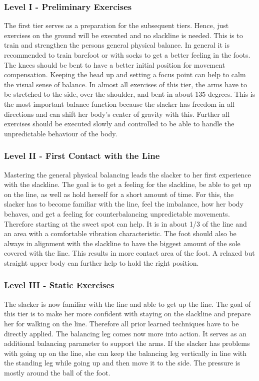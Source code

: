 \subsubsection{Level I - Preliminary Exercises}
The first tier serves as a preparation for the subsequent tiers. Hence, just exercises on the ground will be executed and no slackline is needed. This is to train and strengthen the persons general physical balance. In general it is recommended to train barefoot or with socks to get a better feeling in the foots. The knees should be bent to have a better initial position for movement compensation. Keeping the head up and setting a focus point can help to calm the visual sense of balance. In almost all exercises of this tier, the arms have to be stretched to the side, over the shoulder, and bent in about 135 degrees. This is the most important balance function because the slacker has freedom in all directions and can shift her body's center of gravity with this. Further all exercises should be executed slowly and controlled to be able to handle the unpredictable behaviour of the body.

\subsubsection{Level II - First Contact with the Line}
Mastering the general physical balancing leads the slacker to her first experience with the slackline. The goal is to get a feeling for the slackline, be able to get up on the line, as well as hold herself for a short amount of time. For this, the slacker has to become familiar with the line, feel the imbalance, how her body behaves, and get a feeling for counterbalancing unpredictable movements. Therefore starting at the sweet spot can help. It is in about 1/3 of the line and an area with a comfortable vibration characteristic. The foot should also be always in alignment with the slackline to have the biggest amount of the sole covered with the line. This results in more contact area of the foot. A relaxed but straight upper body can further help to hold the right position.

\subsubsection{Level III - Static Exercises}
The slacker is now familiar with the line and able to get up the line. The goal of this tier is to make her more confident with staying on the slackline and prepare her for walking on the line. Therefore all prior learned techniques have to be directly applied. The balancing leg comes now more into action. It serves as an additional balancing parameter to support the arms. If the slacker has problems with going up on the line, she can keep the balancing leg vertically in line with the standing leg while going up and then move it to the side. The pressure is mostly around the ball of the foot.

